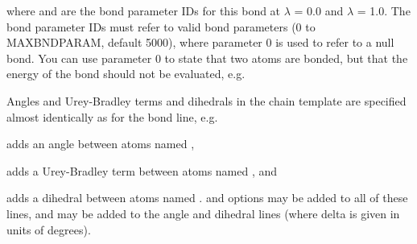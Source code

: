 \documentclass[letterpaper,10pt,english]{sphinxmanual}
\begin{document}
%
\begin{sphinxVerbatim}[commandchars=\\\{\}]
     
\end{sphinxVerbatim}

where  and  are the bond parameter IDs for this bond at \(\lambda\) = 0.0 and \(\lambda\) = 1.0. The bond parameter IDs must refer to valid bond parameters (0 to MAXBNDPARAM, default 5000), where parameter 0 is used to refer to a null bond. You can use parameter 0 to state that two atoms are bonded, but that the energy of the bond should not be evaluated, e.g.

%
\begin{sphinxVerbatim}[commandchars=\\\{\}]
     
\end{sphinxVerbatim}

Angles and Urey-Bradley terms and dihedrals in the chain template are specified almost identically as for the bond line, e.g.

%
\begin{sphinxVerbatim}[commandchars=\\\{\}]
   
\end{sphinxVerbatim}

adds an angle between atoms named ,

%
\begin{sphinxVerbatim}[commandchars=\\\{\}]
   
\end{sphinxVerbatim}

adds a Urey-Bradley term between atoms named , and

%
\begin{sphinxVerbatim}[commandchars=\\\{\}]
    
\end{sphinxVerbatim}

adds a dihedral between atoms named .  and  options may be added to all of these lines, and  may be added to the angle and dihedral lines (where delta is given in units of degrees).
\end{document}
